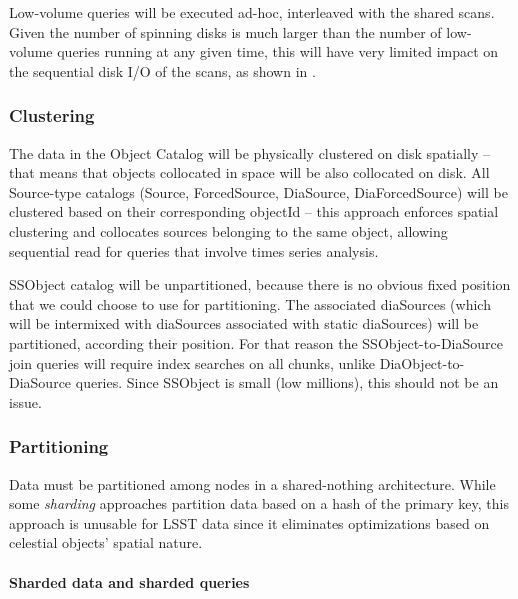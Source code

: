\documentclass[DM,lsstdraft,toc]{lsstdoc}
\begin{document}
Low-volume queries will be executed ad-hoc, interleaved with the shared
scans. Given the number of spinning disks is much larger than the number
of low-volume queries running at any given time, this will have very
limited impact on the sequential disk I/O of the scans, as shown in
.

\subsubsection{Clustering}\label{clustering}

The data in the Object Catalog will be physically clustered on disk
spatially -- that means that objects collocated in space will be also
collocated on disk. All Source-type catalogs (Source, ForcedSource,
DiaSource, DiaForcedSource) will be clustered based on their
corresponding objectId -- this approach enforces spatial clustering and
collocates sources belonging to the same object, allowing sequential
read for queries that involve times series analysis.

SSObject catalog will be unpartitioned, because there is no obvious
fixed position that we could choose to use for partitioning. The
associated diaSources (which will be intermixed with diaSources
associated with static diaSources) will be partitioned, according their
position. For that reason the SSObject-to-DiaSource join queries will
require index searches on all chunks, unlike DiaObject-to-DiaSource
queries. Since SSObject is small (low millions), this should not be an
issue.

\subsubsection{Partitioning}\label{partitioning}

Data must be partitioned among nodes in a shared-nothing architecture.
While some \emph{sharding} approaches partition data based on a hash of
the primary key, this approach is unusable for LSST data since it
eliminates optimizations based on celestial objects' spatial nature.

\paragraph{Sharded data and sharded
queries}\label{sharded-data-and-sharded-queries}
\end{document}
